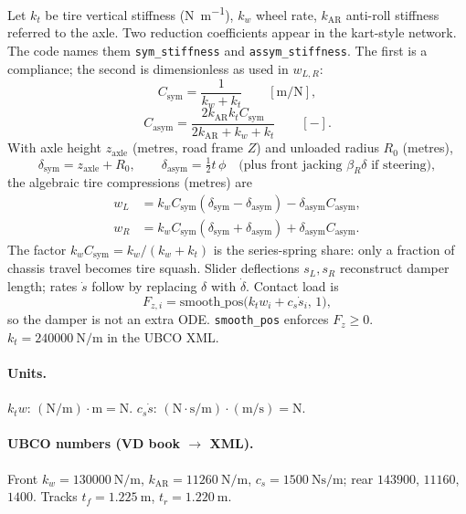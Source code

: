 \documentclass[11pt,letterpaper]{article}
\begin{document}
Let $k_t$ be tire vertical stiffness (\si{\newton\per\metre}), $k_w$
wheel rate, $k_{\mathrm{AR}}$ anti-roll stiffness referred to the axle.
Two reduction coefficients appear in the kart-style network. The code
names them \texttt{sym\_stiffness} and \texttt{assym\_stiffness}. The
first is a compliance; the second is dimensionless as used in $w_{L,R}$:
\begin{equation}
  C_{\mathrm{sym}} = \frac{1}{k_w + k_t}
  \qquad [\si{\metre\per\newton}],
\end{equation}
\begin{equation}
  C_{\mathrm{asym}}
  = \frac{2 k_{\mathrm{AR}} k_t C_{\mathrm{sym}}}{2 k_{\mathrm{AR}} + k_w + k_t}
  \qquad [-].
\end{equation}
With axle height $z_{\mathrm{axle}}$ (metres, road frame $Z$) and
unloaded radius $R_0$ (metres),
\[
  \delta_{\mathrm{sym}} = z_{\mathrm{axle}} + R_0,\qquad
  \delta_{\mathrm{asym}} = \tfrac12 t\,\phi
  \quad\text{(plus front jacking $\beta_R\delta$ if steering)},
\]
the algebraic tire compressions (metres) are
\begin{align}
  w_L &= k_w C_{\mathrm{sym}}(\delta_{\mathrm{sym}}-\delta_{\mathrm{asym}})
        - \delta_{\mathrm{asym}} C_{\mathrm{asym}},\\
  w_R &= k_w C_{\mathrm{sym}}(\delta_{\mathrm{sym}}+\delta_{\mathrm{asym}})
        + \delta_{\mathrm{asym}} C_{\mathrm{asym}}.
\end{align}
The factor $k_w C_{\mathrm{sym}} = k_w/(k_w+k_t)$ is the series-spring
share: only a fraction of chassis travel becomes tire squash. Slider
deflections $s_L,s_R$ reconstruct damper length; rates $\dot s$ follow
by replacing $\delta$ with $\dot\delta$. Contact load is
\begin{equation}
  F_{z,i} = \mathrm{smooth\_pos}\bigl(k_t w_i + c_s \dot s_i,\, 1\bigr),
  \label{eq:fz}
\end{equation}
so the damper is not an extra ODE. \texttt{smooth\_pos} enforces
$F_z\ge 0$. $k_t=\SI{240000}{\newton\per\metre}$ in the UBCO XML.

\paragraph{Units.}
$k_t w$: $(\mathrm{N/m})\cdot\mathrm{m} = \mathrm{N}$.
$c_s \dot s$: $(\mathrm{N\cdot s/m})\cdot(\mathrm{m/s}) = \mathrm{N}$.

\paragraph{UBCO numbers (VD book $\to$ XML).}
Front $k_w=\SI{130000}{\newton\per\metre}$,
$k_{\mathrm{AR}}=\SI{11260}{\newton\per\metre}$,
$c_s=\SI{1500}{\newton\second\per\metre}$; rear $143900$, $11160$,
$1400$. Tracks $t_f=\SI{1.225}{\metre}$, $t_r=\SI{1.220}{\metre}$.
\end{document}
